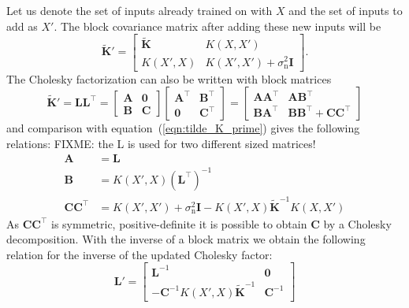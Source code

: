 \documentclass[11pt,a4paper]{scrreprt}
\newcommand{\mat}[1]{\bm{#1}}
\newcommand{\T}{^{\top}}
\newcommand{\ped}[1]{_{\mathrm{#1}}}
\begin{document}
Let us denote the set of inputs already trained on with $X$ and the set of 
inputs to add as $X'$. The block covariance matrix after adding these new inputs 
will be
\begin{equation} \label{eqn:tilde_K_prime}
    \tilde{\mat K}' = \left[ \begin{array}{cc}
            \tilde{\mat K} & K(X, X') \\ K(X', X) & K(X', X') 
            + \sigma\ped{n}^2\mat I
        \end{array}
    \right]\text{.}
\end{equation}
The Cholesky factorization can also be written with block matrices
\begin{equation}
    \tilde{\mat K}' = \mat L \mat L\T = \left[
        \begin{array}{cc}
            \mat A & \mat 0 \\ \mat B & \mat C
        \end{array}
    \right] \left[
        \begin{array}{cc}
            \mat A\T & \mat B\T \\ \mat 0 & \mat C\T
        \end{array}
    \right] = \left[
        \begin{array}{cc}
            \mat A \mat A\T & \mat A \mat B\T \\ \mat B \mat A\T & \mat B \mat 
            B\T + \mat C \mat C\T
        \end{array}
    \right]
\end{equation}
and comparison with equation~(\ref{eqn:tilde_K_prime}) gives the following 
relations:
FIXME: the L is used for two different sized matrices!
\begin{align}
    \mat A &= \mat L \\
    \mat B &= K(X', X) (\mat L\T)^{-1} \\
    \mat C \mat C\T &= K(X', X') + \sigma\ped{n}^2\mat I - K(X', X)\tilde{\mat 
        K}^{-1}K(X, X')
\end{align}
As $\mat C \mat C\T$ is symmetric, positive-definite it is possible to obtain 
$\mat C$ by a Cholesky decomposition.
With the inverse of a block matrix \parencite[45]{Petersen:2008wc} we obtain the 
following relation for the inverse of the updated Cholesky factor:
\begin{equation}
    \mat L' = \left[
        \begin{array}{cc}
            \mat L^{-1} & \mat 0 \\ -\mat C^{-1} K(X', X)\tilde{\mat K}^{-1} 
            & \mat C^{-1}
        \end{array}
    \right]
\end{equation}
\end{document}
